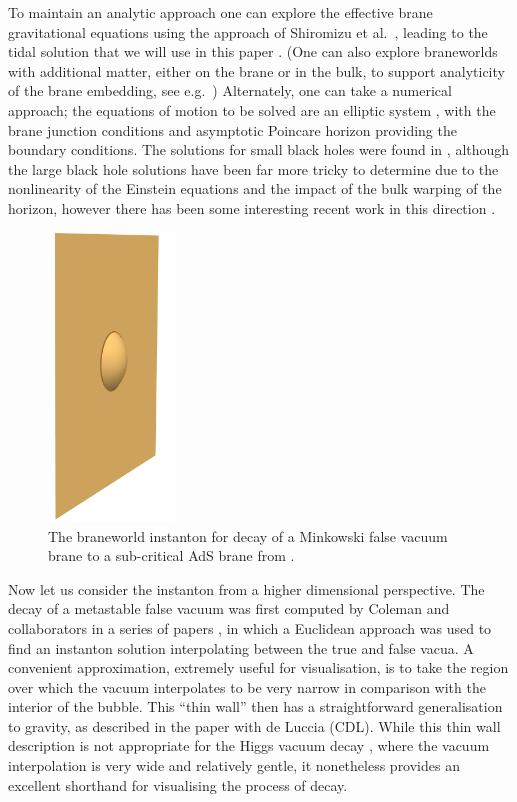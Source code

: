 \documentclass[aps,12pt,prd,superscriptaddress,preprintnumbers, 
	amssymb,
	amsmath,
	notitlepage,
	longbibliography,
	nofootinbib]{revtex4-1}
\begin{document}
To maintain an analytic approach one can explore the 
effective brane gravitational equations using the approach of 
Shiromizu et al.\ \cite{Shiromizu:1999wj}, leading to the tidal solution 
that we will use in this paper \cite{Dadhich:2000am}. (One can also
explore braneworlds with additional matter, either on the brane or in the
bulk, to support analyticity of the brane embedding, see e.g.\ 
\cite{Galfard:2005va,Creek:2006je,Dai:2010jx,Kanti:2013lca})
Alternately, one can take a numerical approach; the equations of motion 
to be solved are an elliptic system \cite{Wiseman:2001xt}, with
the brane junction conditions and asymptotic Poincare
horizon providing the boundary conditions. The solutions for small
black holes were found  in \cite{Kudoh:2003xz}, although the
large black hole solutions have been far more tricky to 
determine due to the nonlinearity of the Einstein equations and
the impact of the bulk warping of the horizon, however there has
been some interesting recent work in this direction 
\cite{Figueras:2011gd,Wang:2016nqi}.

\begin{figure}
\centering
\vskip -5mm
\includegraphics[width=0.3\textwidth]{simplcdladsa.pdf}
\caption{
The braneworld instanton for decay of a Minkowski false vacuum 
brane to a sub-critical AdS brane from \cite{Gregory:2001dn}. }
\label{fig:simplecdl}
\end{figure}
Now let us consider the instanton from a higher dimensional perspective. 
The decay of a metastable false vacuum was first computed by Coleman
and collaborators in a series of papers \cite{coleman1977,callan1977,CDL}, 
in which a Euclidean approach was used to find an instanton solution
interpolating between the true and false vacua. A convenient approximation,
extremely useful for visualisation, is to take the region over which the 
vacuum interpolates to be very narrow in comparison with the interior
of the bubble. This ``thin wall'' then has a straightforward generalisation
to gravity, as described in the paper with de Luccia \cite{CDL} (CDL).
While this thin wall description is not appropriate for the Higgs
vacuum decay \cite{BGM3}, where the vacuum interpolation is 
very wide and relatively gentle, it nonetheless provides an excellent
shorthand for visualising the process of decay. 
\end{document}
